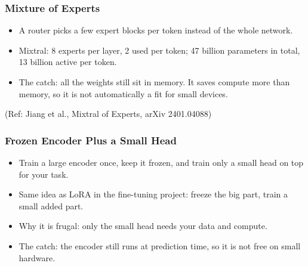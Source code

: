 \begin{frame}[fragile]\frametitle{Mixture of Experts}
\begin{itemize}
\item A router picks a few expert blocks per token instead of the whole network.
\item Mixtral: 8 experts per layer, 2 used per token; 47 billion parameters in total, 13 billion active per token.
\item The catch: all the weights still sit in memory. It saves compute more than memory, so it is not automatically a fit for small devices.
\end{itemize}
{\tiny (Ref: Jiang et al., Mixtral of Experts, arXiv 2401.04088)}
\end{frame}

\begin{frame}[fragile]\frametitle{Frozen Encoder Plus a Small Head}
\begin{center}
\end{center}
\begin{itemize}
\item Train a large encoder once, keep it frozen, and train only a small head on top for your task.
\item Same idea as LoRA in the fine-tuning project: freeze the big part, train a small added part.
\item Why it is frugal: only the small head needs your data and compute.
\item The catch: the encoder still runs at prediction time, so it is not free on small hardware.
\end{itemize}
\end{frame}
